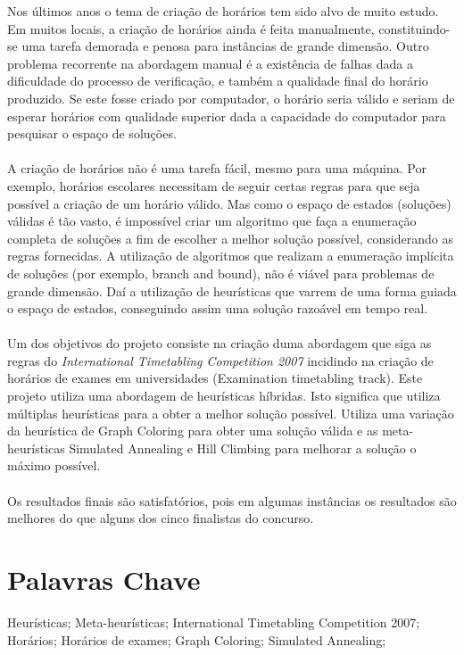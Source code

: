 Nos últimos anos o tema de criação de horários tem sido alvo de muito estudo. Em muitos locais, a criação de horários ainda é feita manualmente, constituindo-se uma tarefa demorada e penosa para instâncias de grande dimensão. Outro problema recorrente na abordagem manual é a existência de falhas dada a dificuldade do processo de verificação, e também a qualidade final do horário produzido. Se este fosse criado por computador, o horário seria válido e seriam de esperar horários com qualidade superior dada a capacidade do computador para pesquisar o espaço de soluções.\\
\\
A criação de horários não é uma tarefa fácil, mesmo para uma máquina. Por exemplo, horários escolares necessitam de seguir certas regras para que seja possível a criação de um horário válido. Mas como o espaço de estados (soluções) válidas é tão vasto, é impossível criar um algoritmo que faça a enumeração completa de soluções a fim de escolher a melhor solução possível, considerando as regras fornecidas. A utilização de algoritmos que realizam a enumeração implícita de soluções (por exemplo, branch and bound), não é viável para problemas de grande dimensão. Daí a utilização de heurísticas que varrem de uma forma guiada o espaço de estados, conseguindo assim uma solução razoável em tempo real.\\
\\
Um dos objetivos do projeto consiste na criação duma abordagem que siga as regras do \textit{International Timetabling Competition 2007} incidindo na criação de horários de exames em universidades (Examination timetabling track). Este projeto utiliza uma abordagem de heurísticas híbridas. Isto significa que utiliza múltiplas heurísticas para a obter a melhor solução possível. Utiliza uma variação da heurística de Graph Coloring para obter uma solução válida e as meta-heurísticas Simulated Annealing e Hill Climbing para melhorar a solução o máximo possível.\\
\\
Os resultados finais são satisfatórios, pois em algumas instâncias os resultados são melhores do que alguns dos cinco finalistas do concurso.
\
\section*{Palavras Chave}

Heurísticas; Meta-heurísticas; International Timetabling Competition 2007; Horários; Horários de exames; Graph Coloring; Simulated Annealing;
\

